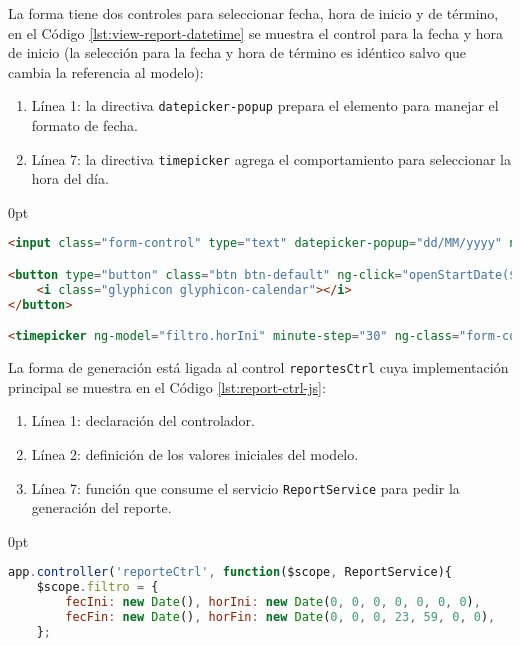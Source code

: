 \begin{enumerate}
La forma tiene dos controles para seleccionar fecha, hora de inicio y de término, en el Código \ref{lst:view-report-datetime} se muestra el control para la fecha y hora de inicio (la selección para la fecha y hora de término es idéntico salvo que cambia la referencia al modelo):
\begin{enumerate}
	\item Línea 1: la directiva \texttt{datepicker-popup} prepara el elemento para manejar el formato de fecha.
	\item Línea 7: la directiva \texttt{timepicker} agrega el comportamiento para seleccionar la hora del día.
\end{enumerate}
\begin{adjustwidth}{\listingfixwidth}{0pt}
\begin{lstlisting}[language=HTML, captionpos=b, caption={Controles para seleccionar fecha y hora en la generación de reportes.}, label={lst:view-report-datetime}]
<input class="form-control" type="text" datepicker-popup="dd/MM/yyyy" ng-model="filtro.fecIni" is-open="startDateOpen" ng-required="true" starting-day="1" />

<button type="button" class="btn btn-default" ng-click="openStartDate($event)">
	<i class="glyphicon glyphicon-calendar"></i>
</button>

<timepicker ng-model="filtro.horIni" minute-step="30" ng-class="form-control"></timepicker>
\end{lstlisting}
\end{adjustwidth}

La forma de generación está ligada al control \texttt{reportesCtrl} cuya implementación principal se muestra en el Código \ref{lst:report-ctrl-js}:

\begin{enumerate}
	\item Línea 1: declaración del controlador.
	\item Línea 2: definición de los valores iniciales del modelo.
	\item Línea 7: función que consume el servicio \texttt{ReportService} para pedir la generación del reporte.
\end{enumerate}

\begin{adjustwidth}{\listingfixwidth}{0pt}
\begin{lstlisting}[language=Javascript, caption={Servicio en \textit{AngularJS} para pedir la generación de un reporte.}, captionpos=b, label={lst:report-ctrl-js}]
app.controller('reporteCtrl', function($scope, ReportService){
	$scope.filtro = {
		fecIni: new Date(), horIni: new Date(0, 0, 0, 0, 0, 0, 0),
		fecFin: new Date(), horFin: new Date(0, 0, 0, 23, 59, 0, 0),
	};
	

\end{lstlisting}
\end{adjustwidth}
\end{enumerate}
